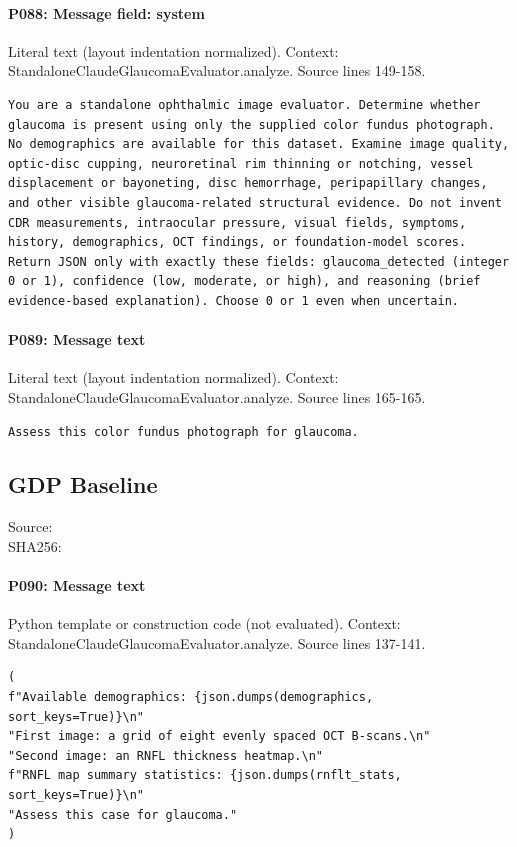 \documentclass[10pt]{article}
\begin{document}
\paragraph{P088: Message field: system}
Literal text (layout indentation normalized). Context: StandaloneClaudeGlaucomaEvaluator.analyze. Source lines 149-158.
\begin{Verbatim}
You are a standalone ophthalmic image evaluator. Determine whether glaucoma is present using only the supplied color fundus photograph. No demographics are available for this dataset. Examine image quality, optic-disc cupping, neuroretinal rim thinning or notching, vessel displacement or bayoneting, disc hemorrhage, peripapillary changes, and other visible glaucoma-related structural evidence. Do not invent CDR measurements, intraocular pressure, visual fields, symptoms, history, demographics, OCT findings, or foundation-model scores. Return JSON only with exactly these fields: glaucoma_detected (integer 0 or 1), confidence (low, moderate, or high), and reasoning (brief evidence-based explanation). Choose 0 or 1 even when uncertain.
\end{Verbatim}
\paragraph{P089: Message text}
Literal text (layout indentation normalized). Context: StandaloneClaudeGlaucomaEvaluator.analyze. Source lines 165-165.
\begin{Verbatim}
Assess this color fundus photograph for glaucoma.
\end{Verbatim}
\subsection{GDP Baseline}
Source: \\
SHA256: {\scriptsize{}}
\paragraph{P090: Message text}
Python template or construction code (not evaluated). Context: StandaloneClaudeGlaucomaEvaluator.analyze. Source lines 137-141.
\begin{Verbatim}
(
f"Available demographics: {json.dumps(demographics, sort_keys=True)}\n"
"First image: a grid of eight evenly spaced OCT B-scans.\n"
"Second image: an RNFL thickness heatmap.\n"
f"RNFL map summary statistics: {json.dumps(rnflt_stats, sort_keys=True)}\n"
"Assess this case for glaucoma."
)
\end{Verbatim}
\end{document}
